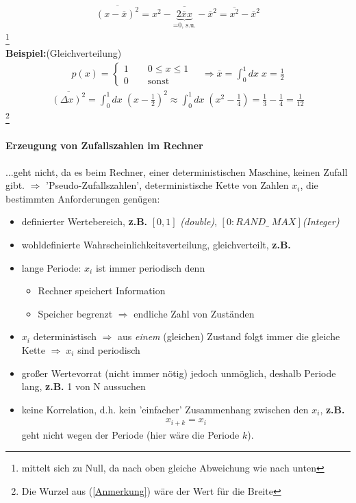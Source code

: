 \documentclass[12pt]{article}
\begin{document}
\begin{align}
\overline{(x-\overline{x})^2} = \overline{x^2 - \underbrace{2 \overline{x} x}_\text{=0, s.u.} - \overline{x}^2} = \overline{x^2} - \overline{x}^2
\end{align}  \footnote{mittelt sich zu Null, da nach oben gleiche Abweichung wie nach unten} \\
\textbf{Beispiel:}(Gleichverteilung) 
\begin{align*}
p(x) = 
\begin{cases}
1  \quad \quad 0 \leq x \leq 1 \\
0  \quad \quad  \text{sonst}
\end{cases}
\quad \Rightarrow \overline{x}= \int_0^1 dx \; x = \frac{1}{2}
\end{align*}
\begin{align*}
\overline{(\Delta x)^2} = \int_0^1 dx \; (x-\frac{1}{2})^2 \approx  \int_0^1 dx \; (x^2-\frac{1}{4}) = \frac{1}{3} - \frac{1}{4} = \frac{1}{12}   \label{Anmerkung}
\end{align*} \footnote{Die Wurzel aus (\ref{Anmerkung}) wäre der Wert für die Breite }
\paragraph{Erzeugung von Zufallszahlen im Rechner}
...geht nicht, da es beim Rechner, einer deterministischen Maschine, keinen Zufall gibt. $\Rightarrow$ 'Pseudo-Zufallszahlen', deterministische Kette von Zahlen $x_i$, die bestimmten Anforderungen genügen: 
\begin{itemize}
\item definierter Wertebereich, \textbf{z.B.} $ [ 0,1] $ \textit{(double)}, $[ 0: RAND\_ \; MAX]$\textit{(Integer)}
\item wohldefinierte Wahrscheinlichkeitsverteilung, gleichverteilt, \textbf{ z.B.} %
\item lange Periode: $x_i$ ist immer periodisch denn
\begin{itemize}
\item Rechner speichert Information
\item Speicher begrenzt $\Rightarrow$ endliche Zahl von Zuständen
\end{itemize}
\item $x_i$ deterministisch $\Rightarrow$ aus \textit{einem} (gleichen) Zustand folgt immer die gleiche Kette $\Rightarrow \; x_i$ sind periodisch
\item großer Wertevorrat (nicht immer nötig) jedoch unmöglich, deshalb Periode lang,\textbf{ z.B.} 1 von N %
aussuchen
\item keine Korrelation, d.h. kein 'einfacher' Zusammenhang zwischen den $x_i$, \textbf{ z.B.}
\begin{align*}
x_{i+k} = x_i 
\end{align*}
geht nicht wegen der Periode (hier wäre die Periode $k$).
\end{itemize}
\end{document}
